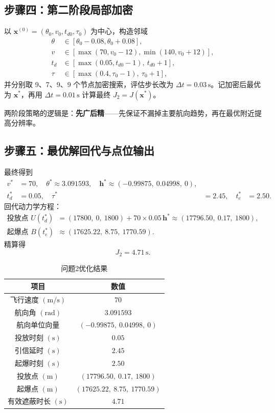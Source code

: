 \documentclass[withoutpreface,bwprint]{cumcmthesis}
\begin{document}
\subsection{步骤四：第二阶段局部加密}
以 $\mathbf{x}^{(0)}=(\theta_0,v_0,t_{d0},\tau_0)$ 为中心，构造邻域
\begin{align}
\theta&\in[\theta_0-0.08,\theta_0+0.08],\\
v&\in[\max(70,v_0-12),\min(140,v_0+12)],\\
t_d&\in[\max(0.05,t_{d0}-1),\ t_{d0}+1],\\
\tau&\in[\max(0.4,\tau_0-1),\ \tau_0+1],
\end{align}
并分别取 9、7、9、9 个节点加密搜索，评估步长改为 $\Delta t=0.03\,\mathrm{s}$。记加密后最优为 $\mathbf{x}^\ast$，再用 $\Delta t=0.01\,\mathrm{s}$ 计算最终 $J_2=J(\mathbf{x}^\ast)$。

两阶段策略的逻辑是：\textbf{先广后精}——先保证不漏掉主要航向趋势，再在最优附近提高分辨率。

\subsection{步骤五：最优解回代与点位输出}
最终得到
\begin{align}
v^\ast&=70,\quad
\theta^\ast\approx 3.091593,\quad
\mathbf{h}^\ast\approx(-0.99875,\ 0.04998,\ 0),\\
t_d^\ast&=0.05,\quad
\tau^\ast&=2.45,\quad
t_e^\ast&=2.50.
\end{align}
回代动力学方程：
\begin{align}
\text{投放点 }U(t_d^\ast)
&=(17800,\ 0,\ 1800)+70\times 0.05\,\mathbf{h}^\ast
\approx(17796.50,\ 0.17,\ 1800),\\
\text{起爆点 }B(t_e^\ast)
&\approx(17625.22,\ 8.75,\ 1770.59).
\end{align}
精算得
\begin{equation}
J_2=4.71\,\mathrm{s}.
\end{equation}

\begin{table}[!htbp]
\centering
\caption{问题2优化结果}
\label{tab:q2}
\begin{tabular}{cc}
\toprule[1.5pt]
项目 & 数值 \\
\midrule[1pt]
飞行速度 $(\mathrm{m/s})$ & $70$ \\
航向角 $(\mathrm{rad})$ & $3.091593$ \\
航向单位向量 & $(-0.99875,\ 0.04998,\ 0)$ \\
投放时刻 $(\mathrm{s})$ & $0.05$ \\
引信延时 $(\mathrm{s})$ & $2.45$ \\
起爆时刻 $(\mathrm{s})$ & $2.50$ \\
投放点 $(\mathrm{m})$ & $(17796.50,\ 0.17,\ 1800)$ \\
起爆点 $(\mathrm{m})$ & $(17625.22,\ 8.75,\ 1770.59)$ \\
有效遮蔽时长 $(\mathrm{s})$ & $4.71$ \\
\bottomrule[1.5pt]
\end{tabular}
\end{table}
\end{document}
